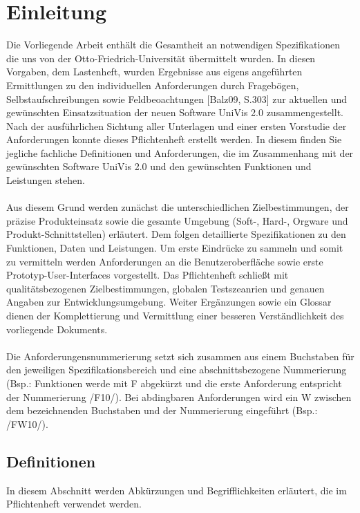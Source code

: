 \section{Einleitung}
\label{sec:Einleitung}

Die Vorliegende Arbeit enthält die Gesamtheit an notwendigen Spezifikationen die uns von der Otto-Friedrich-Universität übermittelt wurden. 
In diesen Vorgaben, dem Lastenheft, wurden Ergebnisse aus eigens angeführten Ermittlungen zu den individuellen Anforderungen durch Fragebögen, Selbstaufschreibungen sowie Feldbeoachtungen [Balz09, S.303] zur aktuellen und gewünschten Einsatzsituation der neuen Software UniVis 2.0 zusammengestellt.
Nach der ausführlichen Sichtung aller Unterlagen und einer ersten Vorstudie der Anforderungen konnte dieses Pflichtenheft erstellt werden. In diesem finden Sie jegliche fachliche Definitionen und Anforderungen, die im Zusammenhang mit der gewünschten Software UniVis 2.0 und den gewünschten Funktionen und Leistungen stehen.
\\
\\
Aus diesem Grund werden zunächst die unterschiedlichen Zielbestimmungen, der präzise Produkteinsatz sowie die gesamte Umgebung (Soft-, Hard-, Orgware und Produkt-Schnittstellen) erläutert.
Dem folgen detaillierte Spezifikationen zu den Funktionen, Daten und Leistungen. Um erste Eindrücke zu sammeln und somit zu vermitteln werden Anforderungen an die Benutzeroberfläche sowie erste Prototyp-User-Interfaces vorgestellt. Das Pflichtenheft schließt mit qualitätsbezogenen Zielbestimmungen, globalen Testszeanrien und genauen Angaben zur Entwicklungsumgebung.
Weiter Ergänzungen sowie ein Glossar dienen der Komplettierung und Vermittlung einer besseren Verständlichkeit des vorliegende Dokuments.
\\
\\
Die Anforderungensnummerierung setzt sich zusammen aus einem Buchstaben für den jeweiligen Spezifikationsbereich und eine abschnittsbezogene Nummerierung (Bsp.: Funktionen werde mit F abgekürzt und die erste Anforderung entspricht der Nummerierung /F10/). Bei abdingbaren Anforderungen wird ein W zwischen dem bezeichnenden Buchstaben und der Nummerierung eingeführt (Bsp.: /FW10/).

\subsection{Definitionen}
\label{sec:Definitionen}

In diesem Abschnitt werden Abkürzungen und Begrifflichkeiten erläutert, die im Pflichtenheft verwendet werden. \\[0.25cm]

